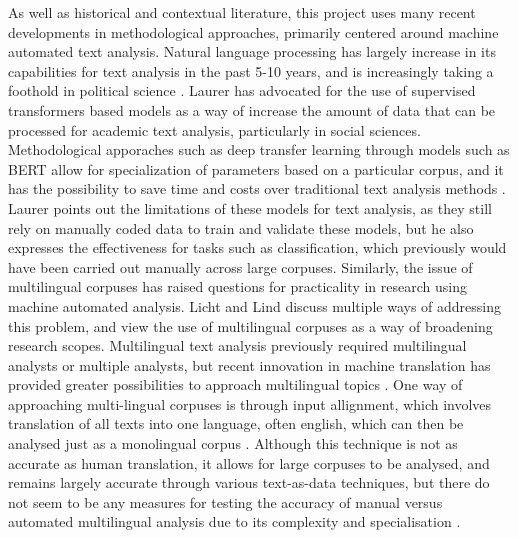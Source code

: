 As well as historical and contextual literature, this project uses many recent developments in methodological approaches, primarily centered around machine automated text analysis. Natural language processing has largely increase in its capabilities for text analysis in the past 5-10 years, and is increasingly taking a foothold in political science \Parencites{laurer2024}{lucas2015}. Laurer \parencite*[][p. 85-86]{laurer2024} has advocated for the use of supervised transformers based models as a way of increase the amount of data that can be processed for academic text analysis, particularly in social sciences. Methodological apporaches such as deep transfer learning through models such as BERT allow for specialization of parameters based on a particular corpus, and it has the possibility to save time and costs over traditional text analysis methods \Parencite[][p. 87-90]{laurer2024}. Laurer \parencite*[][p. 96-97]{laurer2024} points out the limitations of these models for text analysis, as they still rely on manually coded data to train and validate these models, but he also expresses the effectiveness for tasks such as classification, which previously would have been carried out manually across large corpuses. Similarly, the issue of multilingual corpuses has raised questions for practicality in research using machine automated analysis. Licht and Lind \parencite*{haukelicht2023} discuss multiple ways of addressing this problem, and view the use of multilingual corpuses as a way of broadening research scopes. Multilingual text analysis previously required multilingual analysts or multiple analysts, but recent innovation in machine translation has provided greater possibilities to approach multilingual topics \Parencite[][p. 4-6]{haukelicht2023}. One way of approaching multi-lingual corpuses is through input allignment, which involves translation of all texts into one language, often english, which can then be analysed just as a monolingual corpus \Parencite[][p. 10-11]{haukelicht2023}. Although this technique is not as accurate as human translation, it allows for large corpuses to be analysed, and remains largely accurate through various text-as-data techniques, but there do not seem to be any measures for testing the accuracy of manual versus automated multilingual analysis due to its complexity and specialisation \Parencite[][p. 20-21]{haukelicht2023}. 

